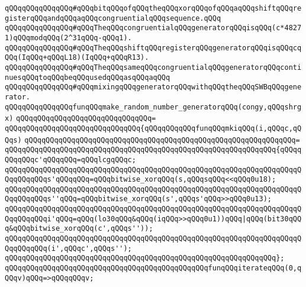 \verb|qQQqqQQqqQQqqQQq#qQQqbitqQQqofqQQqtheqQQqxorqQQqofqQQqaqQQqshiftqQQqregisterqQQqandqQQqaqQQqcongruentialqQQqsequence.qQQq|\newline
\verb|qQQqqQQqqQQqqQQq#qQQqTheqQQqcongruentialqQQqgeneratorqQQqisqQQq(c*48271)qQQqmodqQQq(2^31qQQq-qQQq1).|\newline
\verb|qQQqqQQqqQQqqQQq#qQQqTheqQQqshiftqQQqregisterqQQqgeneratorqQQqisqQQqcqQQq(IqQQq+qQQqL18)(IqQQq+qQQqR13).|\newline
\verb|qQQqqQQqqQQqqQQq#qQQqTheqQQqsameqQQqcongruentialqQQqgeneratorqQQqcontinuesqQQqtoqQQqbeqQQqusedqQQqasqQQqaqQQq|\newline
\verb|qQQqqQQqqQQqqQQq#qQQqmixingqQQqgeneratorqQQqwithqQQqtheqQQqSWBqQQqgenerator.|\newline
\newline
\verb|qQQqqQQqqQQqqQQqfunqQQqmake_random_number_generatorqQQq(congy,qQQqshrgx)|\newline
\verb|qQQqqQQqqQQqqQQqqQQqqQQqqQQqqQQq=|\newline
\verb|qQQqqQQqqQQqqQQqqQQqqQQqqQQqqQQq{qQQqqQQqqQQqfunqQQqmkiqQQq(i,qQQqc,qQQqs)|\newline
\verb|qQQqqQQqqQQqqQQqqQQqqQQqqQQqqQQqqQQqqQQqqQQqqQQqqQQqqQQqqQQqqQQq=|\newline
\verb|qQQqqQQqqQQqqQQqqQQqqQQqqQQqqQQqqQQqqQQqqQQqqQQqqQQqqQQqqQQqqQQq{qQQqqQQqqQQqc'qQQqqQQq=qQQqlcgqQQqc;|\newline
\newline
\verb|qQQqqQQqqQQqqQQqqQQqqQQqqQQqqQQqqQQqqQQqqQQqqQQqqQQqqQQqqQQqqQQqqQQqqQQqqQQqqQQqs'qQQqqQQq=qQQqbitwise_xorqQQq(s,qQQqsqQQq<<qQQq0u18);|\newline
\verb|qQQqqQQqqQQqqQQqqQQqqQQqqQQqqQQqqQQqqQQqqQQqqQQqqQQqqQQqqQQqqQQqqQQqqQQqqQQqqQQqs''qQQq=qQQqbitwise_xorqQQq(s',qQQqs'qQQq>>qQQq0u13);|\newline
\newline
\verb|qQQqqQQqqQQqqQQqqQQqqQQqqQQqqQQqqQQqqQQqqQQqqQQqqQQqqQQqqQQqqQQqqQQqqQQqqQQqqQQqi'qQQq=qQQq(lo30qQQq&qQQq(iqQQq>>qQQq0u1))qQQq|\verb#|qQQq(bit30qQQq&qQQqbitwise_xorqQQq(c',qQQqs''));#\newline
\newline
\verb|qQQqqQQqqQQqqQQqqQQqqQQqqQQqqQQqqQQqqQQqqQQqqQQqqQQqqQQqqQQqqQQqqQQqqQQqqQQqqQQq(i',qQQqc',qQQqs'');|\newline
\verb|qQQqqQQqqQQqqQQqqQQqqQQqqQQqqQQqqQQqqQQqqQQqqQQqqQQqqQQqqQQqqQQq};|\newline
\newline
\verb|qQQqqQQqqQQqqQQqqQQqqQQqqQQqqQQqqQQqqQQqqQQqqQQqfunqQQqiterateqQQq(0,qQQqv)qQQq=>qQQqqQQqv;|\newline
